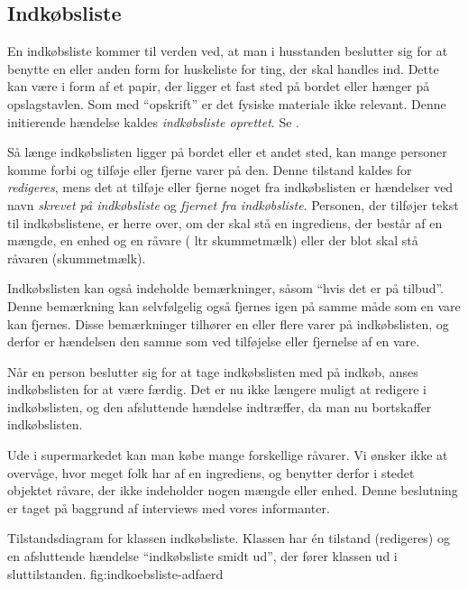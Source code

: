 \subsection{Indkøbsliste}
En indkøbsliste kommer til verden ved, at man i husstanden beslutter sig for at benytte en eller anden form for huskeliste for ting, der skal handles ind. Dette kan være i form af et papir, der ligger et fast sted på bordet eller hænger på opslagstavlen. Som med ``opskrift'' er det fysiske materiale ikke relevant. Denne initierende hændelse kaldes \textit{indkøbsliste oprettet}. Se .

Så længe indkøbslisten ligger på bordet eller et andet sted, kan mange personer komme forbi og tilføje eller fjerne varer på den. Denne tilstand kaldes for \textit{redigeres}, mens det at tilføje eller fjerne noget fra indkøbslisten er hændelser ved navn \textit{skrevet på indkøbsliste} og \textit{fjernet fra indkøbsliste}. Personen, der tilføjer tekst til indkøbslistene, er herre over, om der skal stå en ingrediens, der består af en mængde, en enhed og en råvare ( ltr skummetmælk) eller der blot skal stå råvaren (\fx skummetmælk).

Indkøbslisten kan også indeholde bemærkninger, såsom ``hvis det er på tilbud''. Denne bemærkning kan selvfølgelig også fjernes igen på samme måde som en vare kan fjernes. Disse bemærkninger tilhører en eller flere varer på indkøbslisten, og derfor er hændelsen den samme som ved tilføjelse eller fjernelse af en vare.

Når en person beslutter sig for at tage indkøbslisten med på indkøb, anses indkøbslisten for at være færdig. Det er nu ikke længere muligt at redigere i indkøbslisten, og den afsluttende hændelse indtræffer, da man nu bortskaffer indkøbslisten. 

Ude i supermarkedet kan man købe mange forskellige råvarer. Vi ønsker ikke at overvåge, hvor meget folk har af en ingrediens, og benytter derfor i stedet objektet råvare, der ikke indeholder nogen mængde eller enhed. Denne beslutning er taget på baggrund af interviews med vores informanter.

  {Tilstandsdiagram for klassen indkøbsliste. Klassen har én tilstand (redigeres) og en afsluttende hændelse ``indkøbsliste smidt ud'', der fører klassen ud i sluttilstanden.}
  {fig:indkoebsliste-adfaerd}
